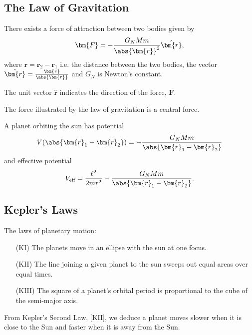 \documentclass[12pt, a4paper]{article}
\begin{document}
\subsection{The Law of Gravitation}

\begin{mdthm}
    There exists a force of attraction between two bodies given by
    \[\bm{F}= - \frac{G_N M m}{\abs{\bm{r}}^2} \hat{\bm{r}},\]
    where \(\bm{r}=\bm{r}_2-\bm{r}_1\) i.e. the distance between the two bodies, the vector \(\hat{\bm{r}}=\frac{\bm{r}}{\abs{\bm{r}}}\) and \(G_N\) is Newton's constant.
\end{mdthm}

\begin{mdnote}
    The unit vector \(\hat{\bm{r}}\) indicates the direction of the force, \(\bm{F}\).
\end{mdnote}

\begin{mdremark}
    The force illustrated by the law of gravitation is a central force.
\end{mdremark}

\begin{mdthm}
    A planet orbiting the sun has potential 
    \[V(\abs{\bm{r}_1-\bm{r}_2}) = - \frac{G_N Mm}{\abs{\bm{r}_1-\bm{r}_2}}\]
    and effective potential 
    \[V_{\text{eff}} = \frac{\ell^2}{2mr^2} -\frac{G_N Mm}{\abs{\bm{r}_1-\bm{r}_2}}.\]
\end{mdthm}

\subsection{Kepler's Laws}

\begin{mdthm}
    The laws of planetary motion:
    \begin{enumerate}
        \item[(KI)] The planets move in an ellipse with the sun at one focus.
        \item[(KII)] The line joining a given planet to the sun sweeps out equal areas over equal times.
        \item[(KIII)] The square of a planet's orbital period is proportional to the cube of the semi-major axis.
    \end{enumerate}
\end{mdthm}

\begin{mdnote}
    From Kepler's Second Law, [KII], we deduce a planet moves slower when it is close to the Sun and faster when it is away from the Sun.
\end{mdnote}
\end{document}
